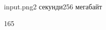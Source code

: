 \begin{problem}{}{input.png}{}{2 секунди}{256 мегабайт}
\begin{example}
{\begin{center}
\end{center}
}{165
}%
%
%
\end{example}

\end{problem}

